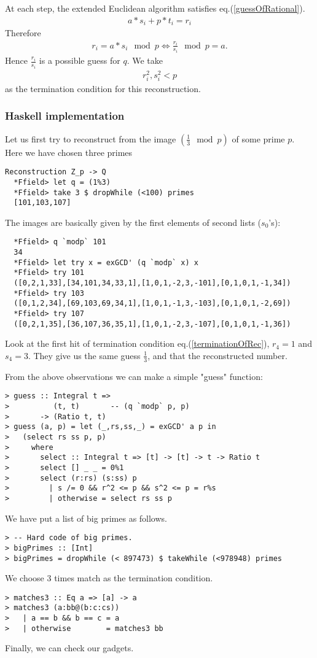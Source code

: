 \documentclass[11pt]{book}
\begin{document}
At each step, the extended Euclidean algorithm satisfies eq.(\ref{guessOfRational}).
\begin{eqnarray}
a*s_i + p*t_i = r_i
\end{eqnarray}
Therefore
\begin{eqnarray}
r_i = a*s_i \mod p \Leftrightarrow \frac{r_i}{s_i} \mod p = a.
\end{eqnarray}
Hence $\frac{r_i}{s_i}$ is a possible guess for $q$.
We take
\begin{eqnarray}
\label{terminationOfRec}
r_i^2 , s_i^2 < p
\end{eqnarray}
as the termination condition for this reconstruction.

\subsubsection{Haskell implementation}
Let us first try to reconstruct from the image $(\frac{1}{3} \mod p)$ of some prime $p$.
Here we have chosen three primes
\begin{verbatim}
Reconstruction Z_p -> Q
  *Ffield> let q = (1%3)
  *Ffield> take 3 $ dropWhile (<100) primes
  [101,103,107]
\end{verbatim}
The images are basically given by the first elements of second lists ($s_0$'s):
\begin{verbatim}  
  *Ffield> q `modp` 101
  34
  *Ffield> let try x = exGCD' (q `modp` x) x
  *Ffield> try 101
  ([0,2,1,33],[34,101,34,33,1],[1,0,1,-2,3,-101],[0,1,0,1,-1,34])
  *Ffield> try 103
  ([0,1,2,34],[69,103,69,34,1],[1,0,1,-1,3,-103],[0,1,0,1,-2,69])
  *Ffield> try 107
  ([0,2,1,35],[36,107,36,35,1],[1,0,1,-2,3,-107],[0,1,0,1,-1,36])  
\end{verbatim}
Look at the first hit of termination condition eq.(\ref{terminationOfRec}), $r_4=1$ and $s_4=3$.
They give us the same guess $\frac{1}{3}$, and that the reconstructed number.

From the above observations we can make a simple "guess" function:
\begin{verbatim}
> guess :: Integral t =>
>          (t, t)       -- (q `modp` p, p)
>       -> (Ratio t, t)
> guess (a, p) = let (_,rs,ss,_) = exGCD' a p in
>   (select rs ss p, p)
>     where
>       select :: Integral t => [t] -> [t] -> t -> Ratio t
>       select [] _ _ = 0%1
>       select (r:rs) (s:ss) p
>         | s /= 0 && r^2 <= p && s^2 <= p = r%s
>         | otherwise = select rs ss p
\end{verbatim}
We have put a list of big primes as follows.
\begin{verbatim}
> -- Hard code of big primes.
> bigPrimes :: [Int]
> bigPrimes = dropWhile (< 897473) $ takeWhile (<978948) primes  
\end{verbatim}
We choose 3 times match as the termination condition.
\begin{verbatim}
> matches3 :: Eq a => [a] -> a
> matches3 (a:bb@(b:c:cs))
>   | a == b && b == c = a
>   | otherwise        = matches3 bb
\end{verbatim}
Finally, we can check our gadgets.
\end{document}
